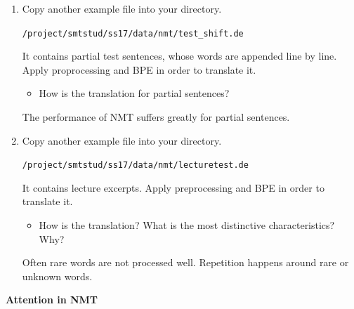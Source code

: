 \documentclass[12pt,fleqn]{article}
\begin{document}
\begin{enumerate} 
\item Copy another example file into your directory. 

\texttt{/project/smtstud/ss17/data/nmt/test\_shift.de} 

It contains partial test sentences, whose words are appended line by line. Apply proprocessing and BPE in order to translate it. 

\begin{itemize} 
\item How is the translation for partial sentences? 
\end{itemize} 

The performance of NMT suffers greatly for partial sentences. 

\item Copy another example file into your directory. 

\texttt{/project/smtstud/ss17/data/nmt/lecturetest.de} 

It contains lecture excerpts. Apply preprocessing and BPE in order to translate it. 

\begin{itemize} 
 \item How is the translation? What is the most distinctive characteristics? Why? 
\end{itemize}

Often rare words are not processed well. Repetition happens around rare or unknown words. 

\end{enumerate}
\newpage
\textbf{Attention in NMT} \\ 
\end{document}
